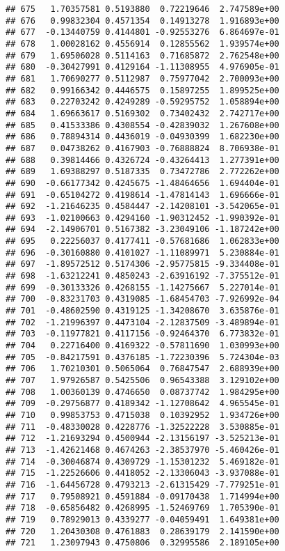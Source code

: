 \documentclass[
]{article}
\begin{document}
\begin{verbatim}
## 675   1.70357581 0.5193880  0.72219646  2.747589e+00
## 676   0.99832304 0.4571354  0.14913278  1.916893e+00
## 677  -0.13440759 0.4144801 -0.92553276  6.864697e-01
## 678   1.00028162 0.4556914  0.12855562  1.939574e+00
## 679   1.69506028 0.5114163  0.71685872  2.762548e+00
## 680  -0.30427991 0.4129164 -1.11308955  4.976905e-01
## 681   1.70690277 0.5112987  0.75977042  2.700093e+00
## 682   0.99166342 0.4446575  0.15897255  1.899525e+00
## 683   0.22703242 0.4249289 -0.59295752  1.058894e+00
## 684   1.69663617 0.5169302  0.73402432  2.742717e+00
## 685   0.41533386 0.4308554 -0.42839032  1.267608e+00
## 686   0.78894314 0.4436019 -0.04930399  1.682230e+00
## 687   0.04738262 0.4167903 -0.76888824  8.706938e-01
## 688   0.39814466 0.4326724 -0.43264413  1.277391e+00
## 689   1.69388297 0.5187335  0.73472786  2.772262e+00
## 690  -0.66177342 0.4245675 -1.48464656  1.694404e-01
## 691  -0.65104272 0.4198614 -1.47814143  1.696666e-01
## 692  -1.21646235 0.4584447 -2.14208101 -3.542065e-01
## 693  -1.02100663 0.4294160 -1.90312452 -1.990392e-01
## 694  -2.14906701 0.5167382 -3.23049106 -1.187242e+00
## 695   0.22256037 0.4177411 -0.57681686  1.062833e+00
## 696  -0.30160880 0.4101027 -1.11089971  5.230884e-01
## 697  -1.89572512 0.5174306 -2.95775815 -9.334408e-01
## 698  -1.63212241 0.4850243 -2.63916192 -7.375512e-01
## 699  -0.30133326 0.4268155 -1.14275667  5.227014e-01
## 700  -0.83231703 0.4319085 -1.68454703 -7.926992e-04
## 701  -0.48602590 0.4319125 -1.34208670  3.635876e-01
## 702  -1.21996397 0.4473104 -2.12837509 -3.489894e-01
## 703  -0.11977821 0.4117156 -0.92464370  6.773832e-01
## 704   0.22716400 0.4169322 -0.57811690  1.030993e+00
## 705  -0.84217591 0.4376185 -1.72230396  5.724304e-03
## 706   1.70210301 0.5065064  0.76847547  2.688939e+00
## 707   1.97926587 0.5425506  0.96543388  3.129102e+00
## 708   1.00360139 0.4746650  0.08737742  1.984295e+00
## 709  -0.29756877 0.4189342 -1.12708642  4.965545e-01
## 710   0.99853753 0.4715038  0.10392952  1.934726e+00
## 711  -0.48330028 0.4228776 -1.32522228  3.530885e-01
## 712  -1.21693294 0.4500944 -2.13156197 -3.525213e-01
## 713  -1.42621468 0.4674263 -2.38537970 -5.460426e-01
## 714  -0.30046874 0.4309729 -1.15301232  5.469182e-01
## 715  -1.22526606 0.4418052 -2.13306043 -3.937088e-01
## 716  -1.64456728 0.4793213 -2.61315429 -7.779251e-01
## 717   0.79508921 0.4591884 -0.09170438  1.714994e+00
## 718  -0.65856482 0.4268995 -1.52469769  1.705390e-01
## 719   0.78929013 0.4339277 -0.04059491  1.649381e+00
## 720   1.20430308 0.4761883  0.28639179  2.141590e+00
## 721   1.23097943 0.4750806  0.32995586  2.189105e+00

\end{verbatim}
\end{document}
